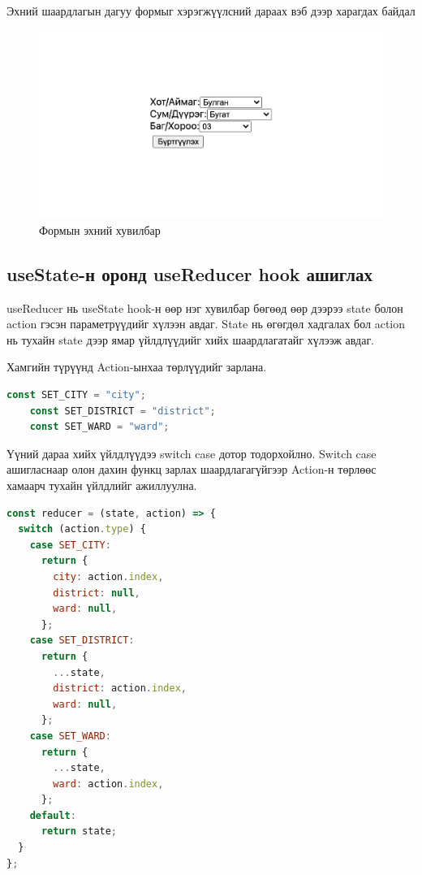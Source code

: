 Эхний шаардлагын дагуу формыг хэрэгжүүлсний дараах вэб дээр харагдах байдал

\begin{figure}
	\centering
	\includegraphics[width=15cm]{images/form-v1.png}
	\caption{Формын эхний хувилбар}
	\label{fig:my_label_1}
\end{figure}

\pagebreak
\subsection{useState-н оронд useReducer hook ашиглах}

useReducer нь useState hook-н өөр нэг хувилбар бөгөөд өөр дээрээ state болон action гэсэн параметрүүдийг хүлээн авдаг. State нь өгөгдөл хадгалах бол action нь тухайн state дээр ямар үйлдлүүдийг хийх шаардлагатайг хүлээж авдаг. 

Хамгийн түрүүнд Action-ынхаа төрлүүдийг зарлана.

\begin{lstlisting}[language=Javascript, caption=Хийх үйлдлүүдийн төрлийг зарлах, frame=single]
	const SET_CITY = "city";
	const SET_DISTRICT = "district";
	const SET_WARD = "ward";
\end{lstlisting}

Үүний дараа хийх үйлдлүүдээ switch case дотор тодорхойлно. Switch case ашигласнаар олон дахин функц зарлах шаардлагагүйгээр Action-н төрлөөс хамаарч тухайн үйлдлийг ажиллуулна. 

\begin{lstlisting}[language=Javascript, caption=Хийх үйлдлүүдийг тодорхойлох, frame=single]
	const reducer = (state, action) => {
  switch (action.type) {
    case SET_CITY:
      return {
        city: action.index,
        district: null,
        ward: null,
      };
    case SET_DISTRICT:
      return {
        ...state,
        district: action.index,
        ward: null,
      };
    case SET_WARD:
      return {
        ...state,
        ward: action.index,
      };
    default:
      return state;
  }
};
\end{lstlisting}

